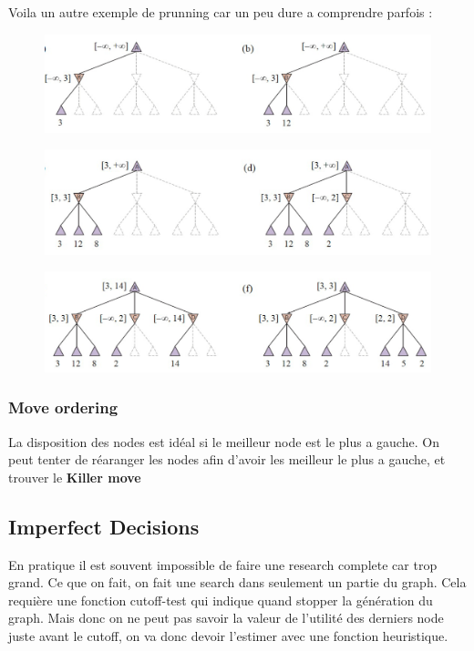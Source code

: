 		Voila un autre exemple de prunning car un peu dure a comprendre parfois :
		
		\begin{figure}[H]
			\centering
			\includegraphics[width=\textwidth]{img/AB.png}
		\end{figure}
		
		\begin{figure}[H]
			\centering
			\includegraphics[width=\textwidth]{img/AB1.png}
		\end{figure}
		
		\begin{figure}[H]
			\centering
			\includegraphics[width=\textwidth]{img/AB2.png}
		\end{figure}
		
		
		\subsubsection{Move ordering}
	
			La disposition des nodes est idéal si le meilleur node est le plus a gauche.
			On peut tenter de réaranger les nodes afin d'avoir les meilleur le plus a gauche, et trouver le \textbf{Killer move}
	\subsection{Imperfect Decisions}
		
		En pratique il est souvent impossible de faire une research complete car trop grand. Ce que on fait, on fait une search dans seulement un partie du graph. Cela requière une fonction  cutoff-test qui indique quand stopper la génération du graph. Mais donc on ne peut pas savoir la valeur de l'utilité des derniers node juste avant le cutoff, on va donc devoir l'estimer avec une fonction heuristique.
		
